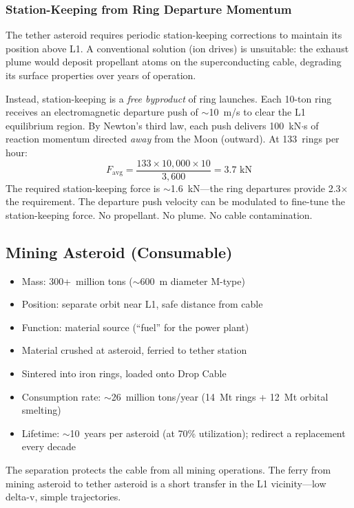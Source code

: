 \documentclass[12pt,letterpaper]{article}
\begin{document}
\subsubsection{Station-Keeping from Ring Departure Momentum}

The tether asteroid requires periodic station-keeping corrections to maintain its position above L1. A conventional solution (ion drives) is unsuitable: the exhaust plume would deposit propellant atoms on the superconducting cable, degrading its surface properties over years of operation.

Instead, station-keeping is a \emph{free byproduct} of ring launches. Each 10-ton ring receives an electromagnetic departure push of ${\sim}$10~m/s to clear the L1 equilibrium region. By Newton's third law, each push delivers 100~kN$\cdot$s of reaction momentum directed \emph{away} from the Moon (outward). At 133~rings per hour:
\begin{equation}
F_{\text{avg}} = \frac{133 \times 10{,}000 \times 10}{3{,}600} = 3.7 \text{~kN}
\end{equation}
The required station-keeping force is $\sim$1.6~kN---the ring departures provide 2.3$\times$ the requirement. The departure push velocity can be modulated to fine-tune the station-keeping force. No propellant. No plume. No cable contamination.

\subsection{Mining Asteroid (Consumable)}

\begin{itemize}
\item Mass: 300+~million tons ($\sim$600~m diameter M-type)
\item Position: separate orbit near L1, safe distance from cable
\item Function: material source (``fuel'' for the power plant)
\item Material crushed at asteroid, ferried to tether station
\item Sintered into iron rings, loaded onto Drop Cable
\item Consumption rate: ${\sim}$26~million tons/year (14~Mt rings + 12~Mt orbital smelting)
\item Lifetime: ${\sim}$10~years per asteroid (at 70\% utilization); redirect a replacement every decade
\end{itemize}

The separation protects the cable from all mining operations. The ferry from mining asteroid to tether asteroid is a short transfer in the L1 vicinity---low delta-v, simple trajectories.
\end{document}
